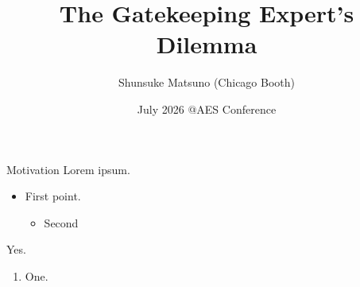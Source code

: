 \documentclass[handout, 11pt, aspectratio=169]{beamer}
\title{The Gatekeeping Expert's Dilemma}
\date{July 2026 @AES Conference}
\author{Shunsuke Matsuno (Chicago Booth)}
\institute{}
\begin{document}
\maketitle




\begin{frame}{Motivation}
  Lorem ipsum.
    \begin{itemize}
      \item First point.
        \begin{itemize}
          \item Second
        \end{itemize}
    \end{itemize}
  Yes.
    \begin{enumerate}
      \item One.
    \end{enumerate}
\end{frame}
\end{document}

